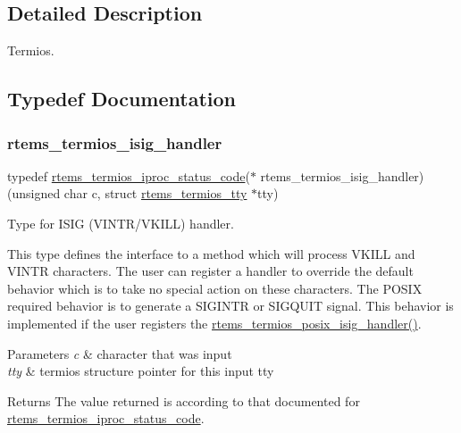 \subsection{Detailed Description}
Termios. 



\subsection{Typedef Documentation}
\mbox{\label{group__Termios_ga8a2610b7c8bcc2c80bbd040f0e773faf}} 
\subsubsection{\texorpdfstring{rtems\_termios\_isig\_handler}{rtems\_termios\_isig\_handler}}
{\footnotesize\ttfamily typedef \mbox{\hyperlink{group__Termios_ga8d00143bb99772a960e237f16437fc1b}{rtems\+\_\+termios\+\_\+iproc\+\_\+status\+\_\+code}}($\ast$ rtems\+\_\+termios\+\_\+isig\+\_\+handler) (unsigned char c, struct \mbox{\hyperlink{structrtems__termios__tty}{rtems\+\_\+termios\+\_\+tty}} $\ast$tty)}



Type for I\+S\+IG (V\+I\+N\+T\+R/\+V\+K\+I\+LL) handler. 

This type defines the interface to a method which will process V\+K\+I\+LL and V\+I\+N\+TR characters. The user can register a handler to override the default behavior which is to take no special action on these characters. The P\+O\+S\+IX required behavior is to generate a S\+I\+G\+I\+N\+TR or S\+I\+G\+Q\+U\+IT signal. This behavior is implemented if the user registers the \mbox{\hyperlink{group__Termios_gad4bc0c678b0c08941507b4259815e571}{rtems\+\_\+termios\+\_\+posix\+\_\+isig\+\_\+handler()}}.


\begin{DoxyParams}{Parameters}
{\em c} & character that was input \\
\hline
{\em tty} & termios structure pointer for this input tty\\
\hline
\end{DoxyParams}
\begin{DoxyReturn}{Returns}
The value returned is according to that documented for \mbox{\hyperlink{group__Termios_ga8d00143bb99772a960e237f16437fc1b}{rtems\+\_\+termios\+\_\+iproc\+\_\+status\+\_\+code}}. 
\end{DoxyReturn}



